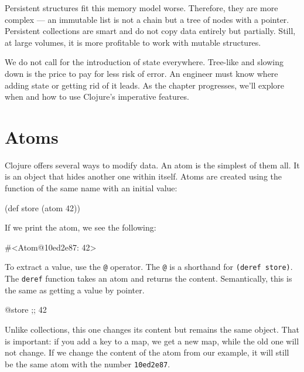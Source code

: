 Persistent structures fit this memory model worse.
Therefore, they are more complex — an immutable list is not a chain but a tree of nodes with a pointer.
Persistent collections are smart and do not copy data entirely but partially.
Still, at large volumes, it is more profitable to work with mutable structures.

We do not call for the introduction of state everywhere.
Tree-like and slowing down is the price to pay for less risk of error.
An engineer must know where adding state or getting rid of it leads.
As the chapter progresses, we'll explore when and how to use Clojure's imperative features.

\section{Atoms}


Clojure offers several ways to modify data.
An atom is the simplest of them all. It is an object that hides another one within itself.
Atoms are created using the function of the same name with an initial value:

\begin{english}
  \begin{clojure}
(def store (atom 42))
  \end{clojure}
\end{english}

If we print the atom, we see the following:

\begin{english}
  \begin{clojure}
#<Atom@10ed2e87: 42>
  \end{clojure}
\end{english}

To extract a value, use the \verb|@| operator.
The \verb|@| is a shorthand for \verb|(deref store)|.
The \verb|deref| function takes an atom and returns the content.
Semantically, this is the same as getting a value
by pointer.


\begin{english}
  \begin{clojure}
@store ;; 42
  \end{clojure}
\end{english}

Unlike collections, this one changes its content but remains the same object.
That is important: if you add a key to a map, we get a new map, while the old one will not change.
If we change the content of the atom from our example, it will still be the same atom with the number \verb|10ed2e87|.

